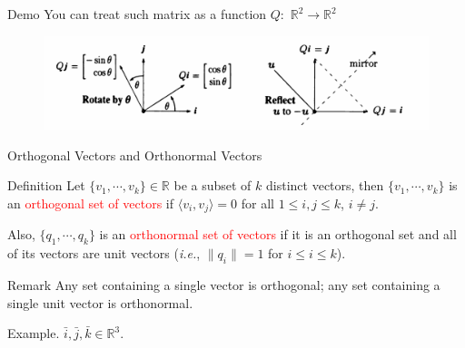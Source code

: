 \documentclass[aspectratio=169]{beamer}
\begin{document}
    \begin{frame}{Demo}
    You can treat such matrix as a function $Q:$ $\mathbb{R}^2 \to \mathbb{R}^2$
                \begin{figure}
            \centering
            \includegraphics[width=1\linewidth]{demo_rotate&reflect.png}
            \label{fig:enter-label}
        \end{figure}
    \end{frame}
    \begin{frame}{Orthogonal Vectors and Orthonormal Vectors}
        \begin{block}{Definition} 
        Let $\{v_1,\cdots,v_k\} \in \mathbb{R}$ be a subset of $k$ distinct vectors, then $\{v_1,\cdots,v_k\}$ is an \textcolor{red}{orthogonal set of vectors} if $\langle v_i, v_j \rangle = 0$ for all $1 \leq i,j \leq k$, $i \neq j$. 
        
        Also, $\{q_1,\cdots,q_k\}$ is an \textcolor{red}{orthonormal set of vectors} if it is an orthogonal set and all of its vectors are unit vectors (\textit{i.e.}, $\|q_i\| = 1$ for $i \leq i \leq k$).

        \end{block}

        \begin{block}{Remark} 
        Any set containing a single vector is orthogonal; any set containing a single unit vector is orthonormal. 
        \end{block}

        \begin{block}{Example.} $\bar{i},\bar{j},\bar{k} \in \mathbb{R}^3$.
        \end{block}
        
    \end{frame}
\end{document}
